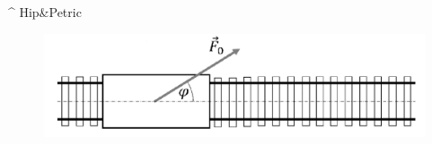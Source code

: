 
\Oznaka{}{}{}
\Rokovi{}
\Tekst{


}
\Rjesenje{}
\Postupak{

}

^\circ
Hip\&Petric

\begin{figure}[h]%
  \begin{center}
    \includegraphics[scale=0.29]{../04_Zakoni_ocuvanja/Zadatak_C210.png}
  \end{center}
\end{figure}
